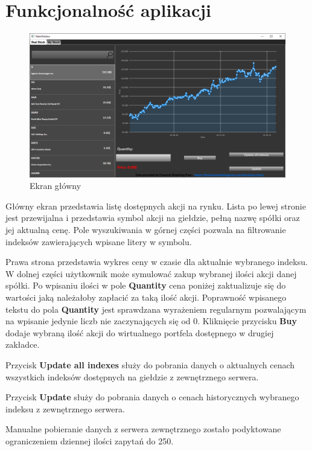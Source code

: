 \documentclass{article}
\begin{document}
\section{Funkcjonalność aplikacji}
\begin{figure}[h]
    \includegraphics[width=\textwidth]{Ekran1.png}
    \caption{Ekran główny}
\end{figure}
\large{
Główny ekran przedstawia listę dostępnych akcji na rynku. Lista po lewej stronie
jest przewijalna i przedstawia symbol akcji na giełdzie, pełną nazwę spółki oraz
jej aktualną cenę. Pole wyszukiwania w górnej części pozwala na filtrowanie indeksów
zawierających wpisane litery w symbolu.

Prawa strona przedstawia wykres ceny w czasie dla aktualnie wybranego indeksu. W
dolnej części użytkownik może symulować zakup wybranej ilości akcji danej
spółki. Po wpisaniu ilości w pole \textbf{Quantity} cena poniżej zaktualizuje się do
wartości jaką należałoby zapłacić za taką ilość akcji. Poprawność wpisanego
tekstu do pola \textbf{Quantity} jest sprawdzana wyrażeniem regularnym pozwalającym na
wpisanie jedynie liczb nie zaczynających się od 0. Kliknięcie przycisku \textbf{Buy}
dodaje wybraną ilość akcji do wirtualnego portfela dostępnego w drugiej
zakładce.

Przycisk \textbf{Update all indexes} służy do pobrania danych o aktualnych
cenach wszystkich indeksów dostępnych na giełdzie z zewnętrznego serwera.

Przycisk \textbf{Update} służy do pobrania danych o cenach historycznych
wybranego indeksu z zewnętrznego serwera.

Manualne pobieranie danych z serwera zewnętrznego zostało podyktowane
ograniczeniem dziennej ilości zapytań do 250.
}
\end{document}
